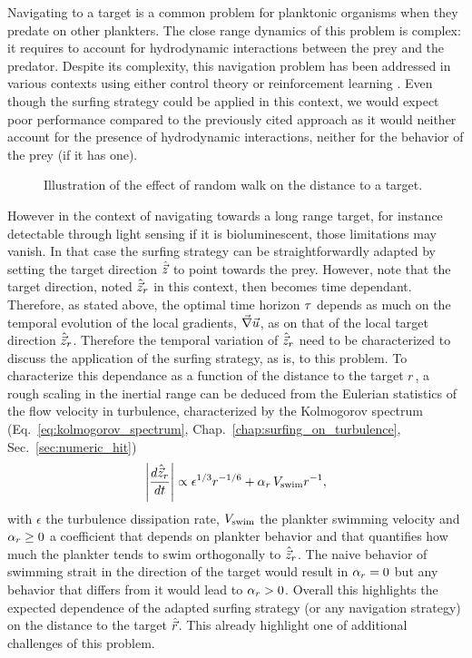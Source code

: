 Navigating to a target is a common problem for planktonic organisms when they predate on other plankters.
The close range dynamics of this problem is complex: it requires to account for hydrodynamic interactions between the prey and the predator.
Despite its complexity, this navigation problem has been addressed in various contexts using either control theory \citep{zhu2022optimising} or reinforcement learning \citep{zhu2022optimising, borra2022reinforcement}.
Even though the surfing strategy could be applied in this context, we would expect poor performance compared to the previously cited approach as it would neither account for the presence of hydrodynamic interactions, neither for the behavior of the prey (if it has one).

\begin{wrapfigure}{R}{0.3\textwidth}
	\centering
	\def\svgwidth{0.3\textwidth}
	
  	\caption{Illustration of the effect of random walk on the distance to a target.}
  	\label{fig:distance_target}
\end{wrapfigure}
However in the context of navigating towards a long range target, for instance detectable through light sensing if it is bioluminescent, those limitations may vanish.
In that case the surfing strategy can be straightforwardly adapted by setting the target direction $\Direction$ to point towards the prey.
However, note that the target direction, noted $\Direction_r$ in this context, then becomes time dependant.
Therefore, as stated above, the optimal time horizon $\TimeHorizon$ depends as much on the temporal evolution of the local gradients, $\Gradients$, as on that of the local target direction $\Direction_r$.
Therefore the temporal variation of $\Direction_r$ need to be characterized to discuss the application of the surfing strategy, as is, to this problem.
To characterize this dependance as a function of the distance to the target $\TargetDistance$, a rough scaling in the inertial range can be deduced from the Eulerian statistics of the flow velocity in turbulence, characterized by the Kolmogorov spectrum (Eq.~\ref{eq:kolmogorov_spectrum}, Chap.~\ref{chap:surfing_on_turbulence}, Sec.~\ref{sec:numeric_hit})
\begin{equation}
	\norm*{\frac{d \Direction_r}{dt}} \propto \epsilon^{1/3} r^{-1/6} + \alpha_\TargetDistance \, \SwimmingVelocity r^{-1},
\end{equation}
with $\epsilon$ the turbulence dissipation rate, $\SwimmingVelocity$ the plankter swimming velocity and $\alpha_\TargetDistance \ge 0$ a coefficient that depends on plankter behavior and that quantifies how much the plankter tends to swim orthogonally to $\Direction_r$.
The naive behavior of swimming strait in the direction of the target would result in $\alpha_\TargetDistance = 0$ but any behavior that differs from it would lead to $\alpha_\TargetDistance > 0$.
Overall this highlights the expected dependence of the adapted surfing strategy (or any navigation strategy) on the distance to the target $\TargetDirection$.
This already highlight one of additional challenges of this problem.


